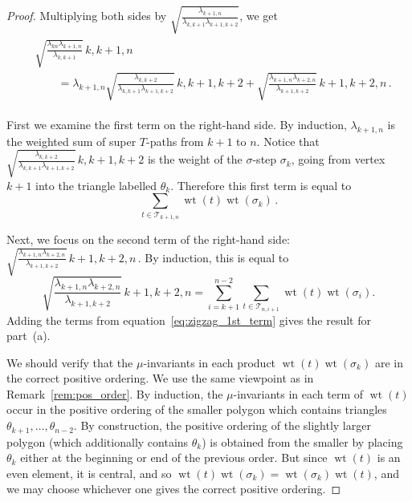 \documentclass[11pt]{article}
\numberwithin{equation}{section}
\numberwithin{equation}{section}
\DeclareMathOperator{\wt}{wt}
\begin{document}
\begin{proof}
 Multiplying both sides by $\sqrt{\frac{\lambda_{k+1,n}}{\lambda_{k,k+1}\lambda_{k+1,k+2}}}$, we get
 \begin{gather*}
 \begin{split}
 & \sqrt{\frac{\lambda_{kn} \lambda_{k+1,n}}{\lambda_{k,k+1}}} \, \boxed{k,k+1,n}\\
& \qquad{}
 = \lambda_{k+1,n} \sqrt{\frac{\lambda_{k,k+2}}{\lambda_{k,k+1}\lambda_{k+1,k+2}}} \, \boxed{k,k+1,k+2}
 + \sqrt{\frac{\lambda_{k+1,n} \lambda_{k+2,n}}{\lambda_{k+1,k+2}}} \, \boxed{k+1,k+2,n}\,.
 \end{split}
 \end{gather*}


 First we examine the first term on the right-hand side. By induction, $\lambda_{k+1,n}$ is the weighted sum of super $T$-paths from $k+1$ to $n$.
 Notice that $\sqrt{\frac{\lambda_{k,k+2}}{\lambda_{k,k+1} \lambda_{k+1,k+2}}} \, \boxed{k,k+1,k+2}$ is the weight of the $\sigma$-step $\sigma_k$, going from
 vertex $k+1$ into the triangle labelled $\theta_k$.
 Therefore this first term is equal to
 \begin{equation} \label{eq:zigzag_1st_term}
 \sum_{t \in \mathcal{T}_{k+1,n}} \wt(t) \wt(\sigma_k)\,.
 \end{equation}

Next, we focus on the second term of the right-hand side: $\sqrt{\frac{\lambda_{k+1,n} \lambda_{k+2,n}}{\lambda_{k+1,k+2}}} \, \boxed{k+1,k+2,n}\,$.
 By induction, this is equal to
 \begin{equation*} %
 \sqrt{\frac{\lambda_{k+1,n} \lambda_{k+2,n}}{\lambda_{k+1,k+2}}} \, \boxed{k+1,k+2,n} = \sum_{i=k+1}^{n-2} \sum_{t \in \mathcal T_{n,i+1}} \wt(t) \wt(\sigma_i).
 \end{equation*}
 Adding the terms from equation~\eqref{eq:zigzag_1st_term} gives the result for part~(a).

 We should verify that the $\mu$-invariants in each product $\wt(t)\wt(\sigma_k)$ are in the correct positive ordering. {We use the same viewpoint as in Remark~\ref{rem:pos_order}.} By induction, the $\mu$-invariants
 in each term of $\wt(t)$ occur in the positive ordering of the smaller polygon which contains triangles $\theta_{k+1},\dots,\theta_{n-2}$.
 By construction, the positive ordering of the slightly larger polygon (which additionally contains $\theta_k$) is obtained from the smaller by
 placing $\theta_k$ either at the beginning or end of the previous order. But since $\wt(t)$ is an even element, it is central, and so
 $\wt(t)\wt(\sigma_k) = \wt(\sigma_k)\wt(t)$, and we may choose whichever one gives the correct positive ordering.


\end{proof}
\end{document}

